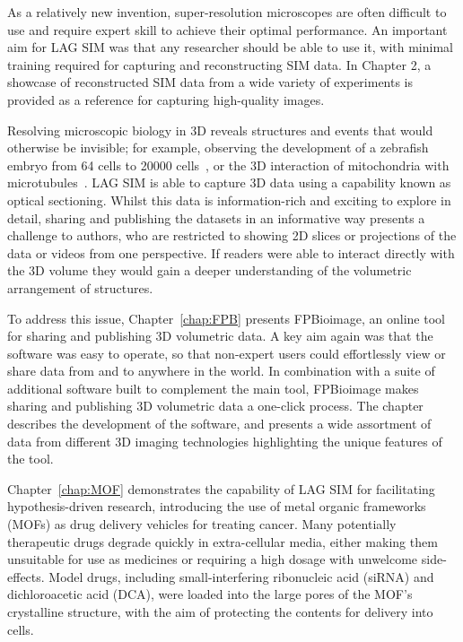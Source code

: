 As a relatively new invention, super-resolution microscopes are often difficult to use and require expert skill to achieve their optimal performance. 
An important aim for LAG SIM was that any researcher should be able to use it, with minimal training required for capturing and reconstructing SIM data. 
In Chapter 2, a showcase of reconstructed SIM data from a wide variety of experiments is provided as a reference for capturing high-quality images. 

Resolving microscopic biology in 3D reveals structures and events that would otherwise be invisible; for example, observing the development of a zebrafish embryo from 64 cells to \num{20000} cells~\cite{keller2008reconstruction}, or the 3D interaction of mitochondria with microtubules~\cite{huang2016ultra}. 
LAG SIM is able to capture 3D data using a capability known as optical sectioning.
Whilst this data is information-rich and exciting to explore in detail, sharing and publishing the datasets in an informative way presents a challenge to authors, who are restricted to showing 2D slices or projections of the data or videos from one perspective.
If readers were able to interact directly with the 3D volume they would gain a deeper understanding of the volumetric arrangement of structures.

To address this issue, Chapter~\ref{chap:FPB} presents FPBioimage, an online tool for sharing and publishing 3D volumetric data. 
A key aim again was that the software was easy to operate, so that non-expert users could effortlessly view or share data from and to anywhere in the world. 
In combination with a suite of additional software built to complement the main tool, FPBioimage makes sharing and publishing 3D volumetric data a one-click process.
The chapter describes the development of the software, and presents a wide assortment of data from different 3D imaging technologies highlighting the unique features of the tool. 

Chapter~\ref{chap:MOF} demonstrates the capability of LAG SIM for facilitating hypothesis-driven research, introducing the use of metal organic frameworks (MOFs) as drug delivery vehicles for treating cancer. 
Many potentially therapeutic drugs degrade quickly in extra-cellular media, either making them unsuitable for use as medicines or requiring a high dosage with unwelcome side-effects. 
Model drugs, including small-interfering ribonucleic acid (siRNA) and dichloroacetic acid (DCA), were loaded into the large pores of the MOF's crystalline structure, with the aim of protecting the contents for delivery into cells. 

